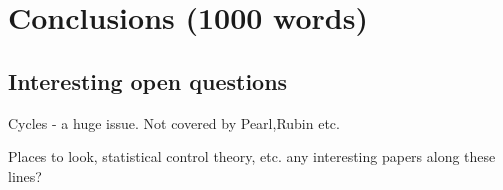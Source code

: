\documentclass[11pt,a4paper]{book}
\begin{document}
\chapter*{Conclusions (1000 words)}

\section*{Interesting open questions}
Cycles - a huge issue. Not covered by Pearl,Rubin etc. 

Places to look, statistical control theory, etc. any interesting papers along these lines?


\end{document}
